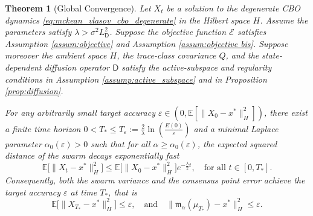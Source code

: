 \documentclass[12pt]{amsart}
\numberwithin{equation}{section}
\newtheorem{theorem}{Theorem}[section]
\begin{document}
\begin{theorem}[Global Convergence] \label{thm:global_convergence_degenerate}
Let $X_t$ be a solution to the degenerate CBO dynamics \eqref{eq:mckean_vlasov_cbo_degenerate} in the Hilbert space $H$. Assume the parameters satisfy  $\lambda > \sigma^2 L_{\mathsf{D}}^2$. Suppose the objective function $\mathscr{E}$ satisfies Assumption \ref{assum:objective} and Assumption \ref{assum:objective bis}. Suppose moreover the ambient space $H$, the trace-class covariance $Q$, and the state-dependent diffusion operator $\mathsf{D}$ satisfy the active-subspace and regularity conditions in Assumption \ref{assump:active_subspace} and in Proposition \ref{prop:diffusion}.

For any arbitrarily small target accuracy $\varepsilon \in (0, \mathbb{E}[\|X_0 - x^*\|_H^2])$, there exist a finite time horizon $0<T_*\leq T_\varepsilon:= \frac{2}{\lambda} \ln \left( \frac{E(0)}{\varepsilon} \right)$ and a minimal Laplace parameter $\alpha_0(\varepsilon) > 0$ such that for all $\alpha \geq \alpha_0(\varepsilon)$, the expected squared distance of the swarm decays exponentially fast 
\begin{equation*} %
    \mathbb{E}\big[\|X_t - x^*\|_H^2\big] \leq \mathbb{E}\big[\|X_0 - x^*\|_H^2\big] e^{-\frac{\lambda}{2} t}, \quad \text{for all } t \in [0, T_*].
\end{equation*}
Consequently, both the swarm variance and the consensus point error achieve the target accuracy $\varepsilon$ at time $T_*$, that is
\begin{equation*}
    \mathbb{E}\big[\|X_{T_*} - x^*\|_H^2\big] \leq \varepsilon, \quad \text{and} \quad \|\mathfrak{m}_{\alpha}(\mu_{T_*}) - x^*\|_H^2 \leq \varepsilon.
\end{equation*}
\end{theorem}
\end{document}
